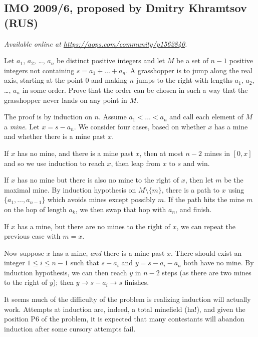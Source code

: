 \documentclass[11pt]{scrartcl}
\begin{document}
\subsection{IMO 2009/6, proposed by Dmitry Khramtsov (RUS)}
\textsl{Available online at \url{https://aops.com/community/p1562840}.}
\begin{mdframed}[style=mdpurplebox,frametitle={Problem statement}]
Let $a_1$, $a_2$, \dots, $a_n$ be distinct positive integers and
let $M$ be a set of $n-1$ positive integers not containing $s = a_1 + \dots + a_n$.
A grasshopper is to jump along the real axis, starting at the point $0$ and
making $n$ jumps to the right with lengths $a_1$, $a_2$, \dots, $a_n$ in some order.
Prove that the order can be chosen in such a way that
the grasshopper never lands on any point in $M$.
\end{mdframed}
The proof is by induction on $n$.
Assume $a_1 < \dots < a_n$ and call each element of $M$ a \emph{mine}.
Let $x = s - a_n$.
We consider four cases, based on whether $x$ has a mine
and whether there is a mine past $x$.
\begin{itemize}
  \ii If $x$ has no mine, and there is a mine past $x$,
  then at most $n-2$ mines in $[0, x]$ and so we use induction to reach $x$,
  then leap from $x$ to $s$ and win.

  \ii If $x$ has no mine but there is also no mine to the right of $x$,
  then let $m$ be the maximal mine.
  By induction hypothesis on $M \setminus \{m\}$, there is a path to $x$
  using $\{a_1, \dots, a_{n-1}\}$ which avoids mines except possibly $m$.
  If the path hits the mine $m$ on the hop of length $a_k$,
  we then swap that hop with $a_n$, and finish.

  \ii If $x$ has a mine, but there are no mines to the right of $x$,
  we can repeat the previous case with $m = x$.

  \ii Now suppose $x$ has a mine, \emph{and} there is a mine past $x$.
  There should exist an integer $1 \le i \le n-1$
  such that $s-a_i$ and $y = s-a_i-a_n$ both have no mine.
  By induction hypothesis, we can then reach $y$ in $n-2$ steps
  (as there are two mines to the right of $y$); then $y \to s-a_i \to s$ finishes.
\end{itemize}

\begin{remark*}
  It seems much of the difficulty of the problem is realizing induction will actually work.
  Attempts at induction are, indeed, a total minefield (ha!),
  and given the position P6 of the problem, it is expected that many contestants
  will abandon induction after some cursory attempts fail.
\end{remark*}
\pagebreak
\end{document}
